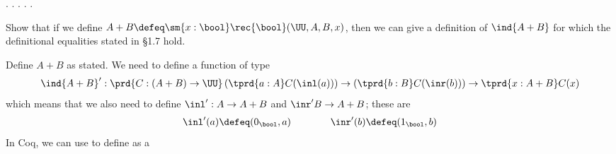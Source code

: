 \begin{coqdoccode}
\coqdocindent{1.00em}
.\coqdoceol
\coqdocindent{1.00em}
 . .\coqdoceol
\coqdocnoindent
{}.\coqdoceol
\coqdocemptyline
\coqdocnoindent
{} .\coqdoceol
\coqdocemptyline
\end{coqdoccode}
Show that if we define $A + B \defeq \sm{x:\bool} \rec{\bool}(\UU, A,
B, x)$, then we can give a definition of $\ind{A+B}$ for which the
definitional equalities stated in \S1.7 hold.


\soln  
Define $A+B$ as stated.  We need to define a function of type
\[
\ind{A+B}' : \prd{C : (A + B) \to \UU}
\left( \tprd{a:A} C(\inl(a))\right)
\to
\left( \tprd{b:B} C(\inr(b))\right)
\to
\tprd{x : A + B} C(x)
\]
which means that we also need to define $\inl' : A \to A + B$ and $\inr' B \to
A + B$; these are
\begin{align*}
\inl'(a) \defeq (0_{\bool}, a)
\qquad\qquad
\inr'(b) \defeq (1_{\bool}, b)
\end{align*}
In Coq, we can use  to define  as a
